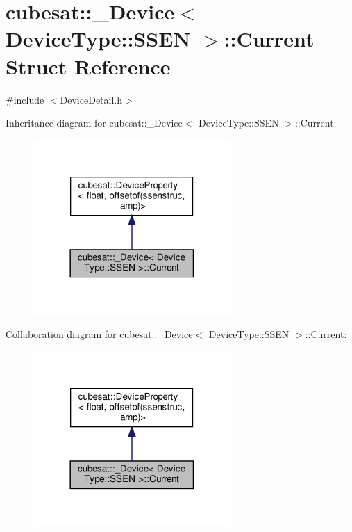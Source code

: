 \hypertarget{structcubesat_1_1__Device_3_01DeviceType_1_1SSEN_01_4_1_1Current}{}\section{cubesat\+:\+:\+\_\+\+Device$<$ Device\+Type\+:\+:S\+S\+EN $>$\+:\+:Current Struct Reference}
\label{structcubesat_1_1__Device_3_01DeviceType_1_1SSEN_01_4_1_1Current}


{\ttfamily \#include $<$Device\+Detail.\+h$>$}



Inheritance diagram for cubesat\+:\+:\+\_\+\+Device$<$ Device\+Type\+:\+:S\+S\+EN $>$\+:\+:Current\+:\nopagebreak
\begin{figure}[H]
\begin{center}
\leavevmode
\includegraphics[width=213pt]{structcubesat_1_1__Device_3_01DeviceType_1_1SSEN_01_4_1_1Current__inherit__graph}
\end{center}
\end{figure}


Collaboration diagram for cubesat\+:\+:\+\_\+\+Device$<$ Device\+Type\+:\+:S\+S\+EN $>$\+:\+:Current\+:\nopagebreak
\begin{figure}[H]
\begin{center}
\leavevmode
\includegraphics[width=213pt]{structcubesat_1_1__Device_3_01DeviceType_1_1SSEN_01_4_1_1Current__coll__graph}
\end{center}
\end{figure}
